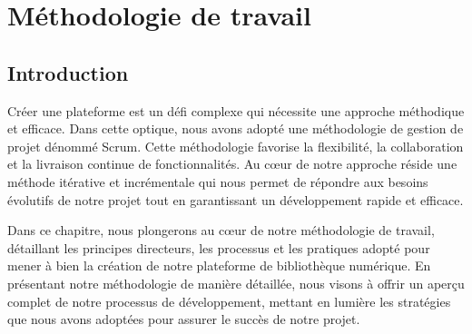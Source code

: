 \chapter{Méthodologie de travail}
\begin{spacing}{1.2}
\minitoc
\thispagestyle{MyStyle}
\end{spacing}
\newpage

\section*{Introduction}
Créer une plateforme est un défi complexe qui nécessite une approche méthodique et efficace. Dans cette optique, nous avons adopté une méthodologie de gestion de projet dénommé Scrum. Cette méthodologie favorise la flexibilité, la collaboration et la livraison continue de fonctionnalités. Au cœur de notre approche réside une méthode itérative et incrémentale qui nous permet de répondre aux besoins évolutifs de notre projet tout en garantissant un développement rapide et efficace.\par

Dans ce chapitre, nous plongerons au cœur de notre méthodologie de travail, détaillant les principes directeurs, les processus et les pratiques adopté pour mener à bien la création de notre plateforme de bibliothèque numérique. En présentant notre méthodologie de manière détaillée, nous visons à offrir un aperçu complet de notre processus de développement, mettant en lumière les stratégies que nous avons adoptées pour assurer le succès de notre projet.
\par
